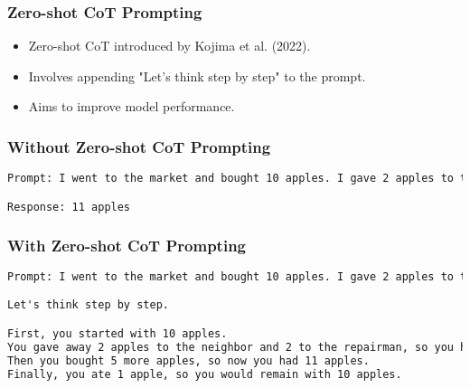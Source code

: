 \begin{frame}[fragile]\frametitle{Zero-shot CoT Prompting}



    \begin{itemize}
      \item Zero-shot CoT introduced by Kojima et al. (2022).
      \item Involves appending "Let's think step by step" to the prompt.
      \item Aims to improve model performance.
    \end{itemize}

\end{frame}

\begin{frame}[fragile]\frametitle{Without Zero-shot CoT Prompting}

\begin{lstlisting}[language=HTML]
Prompt: I went to the market and bought 10 apples. I gave 2 apples to the neighbor and 2 to the repairman. I then went and bought 5 more apples and ate 1. How many apples did I remain with?

Response: 11 apples
\end{lstlisting}


\end{frame}


\begin{frame}[fragile]\frametitle{With Zero-shot CoT Prompting}


\begin{lstlisting}[language=HTML]
Prompt: I went to the market and bought 10 apples. I gave 2 apples to the neighbor and 2 to the repairman. I then went and bought 5 more apples and ate 1. How many apples did I remain with?

Let's think step by step.

First, you started with 10 apples.
You gave away 2 apples to the neighbor and 2 to the repairman, so you had 6 apples left.
Then you bought 5 more apples, so now you had 11 apples.
Finally, you ate 1 apple, so you would remain with 10 apples.
\end{lstlisting}


\end{frame}


